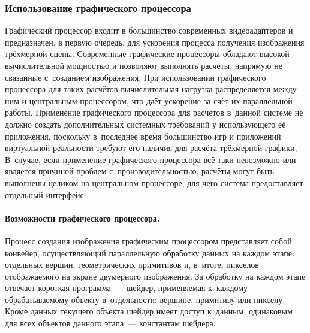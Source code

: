 \documentclass[a4paper, 14pt, titlepage]{extarticle}
\begin{document}
      \subsubsection{Использование графического процессора}\label{sssec:using_gpu}

        Графический процессор входит в большинство современных видеоадаптеров и предназначен, в
        первую очередь, для ускорения процесса получения изображения трёхмерной сцены. Современные
        графические процессоры обладают высокой вычислительной мощностью и позволяют выполнять
        расчёты, напрямую не связанные с~созданием изображения. При использовании графического
        процессора для таких расчётов вычислительная нагрузка распределяется между ним и центральным
        процессором, что даёт ускорение за счёт их параллельной работы. Применение графического
        процессора для расчётов в~данной системе не должно создать дополнительных системных
        требований у использующего её приложения, поскольку в~последнее время большинство игр и
        приложений виртуальной реальности требуют его наличия для расчёта трёхмерной графики, В~случае, если
        применение графического процессора всё-таки невозможно или является причиной проблем
        с~производительностью, расчёты могут быть выполнены целиком на центральном процессоре, для
        чего система предоставляет отдельный интерфейс.

        \paragraph{Возможности графического процессора.}
        Процесс создания изображения графическим процессором представляет собой конвейер,
        осуществляющий параллельную обработку данных на каждом этапе: отдельных вершин,
        геометрических примитивов и, в~итоге, пикселов отображаемого на экране двумерного
        изображения. За обработку на каждом этапе отвечает короткая программа~--- шейдер,
        применяемая к~каждому обрабатываемому объекту в~отдельности: вершине, примитиву или пикселу.
        Кроме данных текущего объекта шейдер имеет доступ к~данным, одинаковым для всех объектов
        данного этапа~--- константам шейдера.
\end{document}
